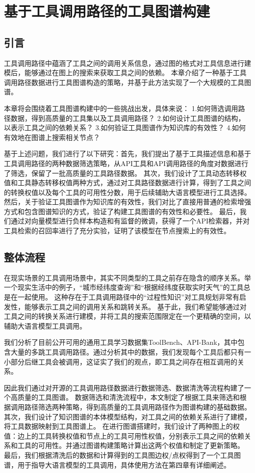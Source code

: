 \chapter{基于工具调用路径的工具图谱构建}

\section{引言}

工具调用路径中蕴涵了工具之间的调用关系信息，通过图的格式对工具信息进行建模后，能够通过在图上的搜索来获取工具之间的依赖。
本章介绍了一种基于工具调用路径数据进行工具图谱构造的策略，并基于此方法实现了一个大规模的工具图谱。

本章将会围绕着工具图谱构建中的一些挑战出发，具体来说：
1.如何筛选调用路径数据，得到高质量的工具集以及工具调用路径？
2.如何设计工具图谱的结构，以表示工具之间的依赖关系？
3.如何验证工具图谱作为知识库的有效性？
4.如何有效地在图谱上搜索相关节点？

基于上述问题，我们进行了以下研究：首先，我们提出了基于工具描述信息和基于工具调用路径的两种数据筛选策略，从API工具和API调用路径的角度对数据进行了筛选，保留了一批高质量的工具路径数据。
其次，我们设计了工具动态转移权值和工具静态转移权值两种方式，通过对工具路径数据进行计算，得到了工具之间的转换权值以及每个工具的可用性分数，用于后续辅助大语言模型进行工具选择。
然后，关于验证工具图谱作为知识库的有效性，我们对比了直接用普通的检索增强方式和包含图谱知识的方式，验证了构建工具图谱的有效性和必要性。
最后，我们通过对向量模型进行负样本构造和有监督的微调，获得了一个API检索器，并对工具检索的召回率进行了充分实验，证明了该模型在节点搜索上的有效性。

\section{整体流程}

在现实场景的工具调用场景中，其实不同类型的工具之前存在隐含的顺序关系。举一个现实生活中的例子，“城市经纬度查询”和“根据经纬度获取实时天气”的工具总是在一起使用。
这种存在于工具调用路径中的“过程性知识”对工具规划非常有启发性，能够表示工具之间的调用关系和跳转关系。
基于此，我们希望能够通过对工具之间的转换关系进行建模，并将工具的搜索范围限定在一个更精确的空间，以辅助大语言模型工具调用。

我们分析了目前公开可用的通用工具学习数据集ToolBench、API-Bank，其中包含大量的多跳工具调用路径。通过分析其中的数据，我们发现每个工具后都只有一小部分后继工具会被调用，这证实了我们的观点，即工具之间存在相互调用的关系。

因此我们通过对开源的工具调用路径数据进行数据筛选、数据清洗等流程构建了一个高质量的工具图谱。
数据筛选和清洗流程中，本文制定了根据工具来筛选和根据调用路径筛选两种策略，得到高质量的工具调用路径作为图谱构建的基础数据。
其次，我们设计了知识图谱的本体模型结构，对工具之间的依赖关系进行了建模，将工具数据映射到工具图谱上。
在进行图谱搭建时，我们设计了两种图上的权值：边上的工具转换权值和节点上的工具可用性权值，分别表示工具之间的依赖关系和工具的可用性。并通过图谱构建策略计算出这两个权值和制定了更新策略。
最后，我们根据清洗后的数据和计算得到的工具图边权/点权得到了一个工具图谱，用于指导大语言模型的工具调用，具体使用方法在第四章有详细阐述。

